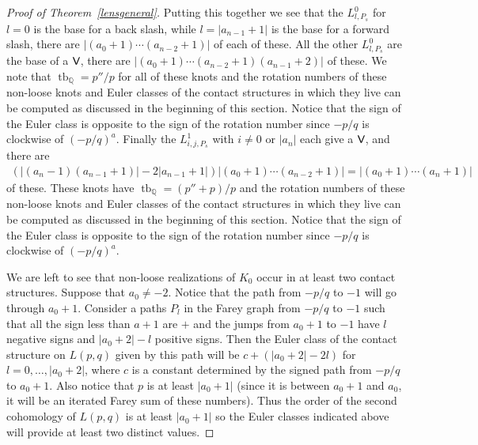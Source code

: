 \documentclass[11pt]{amsart}
\theoremstyle{plain}
\theoremstyle{definition}
\theoremstyle{remark}
\numberwithin{theorem}{section}
\newcommand{\Q}{\mathbb{Q}}           %
\DeclareMathOperator\tb{tb}                   %
\begin{document}
\begin{proof}[Proof of Theorem~\ref{lensgeneral}]
Putting this together we see that the $L^0_{l,P_s}$ for $l=0$ is the base for a back slash, while $l=|a_{n-1}+1|$ is the base for a forward slash, there are $|(a_0+1)\cdots (a_{n-2}+1)|$ of each of these. All the other $L^0_{l,P_s}$ are the base of a $\normalfont\textsf{V}$, there are $\left|(a_0+1)\cdots (a_{n-2}+1)(a_{n-1}+2)\right|$ of these. We note that 
$\tb_\Q=p''/p$ for all of these knots and the rotation numbers of these non-loose knots and Euler classes of the contact structures in which they live can be computed as discussed in the beginning of this section. Notice that the sign of the Euler class is opposite to the sign of the rotation number since $-p/q$ is clockwise of $(-p/q)^a$.  
Finally the $L^1_{i,j,P_s}$ with $i\not=0$ or $|a_n|$ each give a $\normalfont\textsf{V}$, and there are  
\begin{align*}
  (|(a_n-1)(a_{n-1}+1)|-2|a_{n-1}+1|)|(a_0+1)\cdots (a_{n-2}+1)| = |(a_0+1)\cdots(a_n+1)|
\end{align*}
of these. These knots have $\tb_\Q=(p''+p)/p$ and the rotation numbers of these non-loose knots and Euler classes of the contact structures in which they live can be computed as discussed in the beginning of this section. Notice that the sign of the Euler class is opposite to the sign of the rotation number since $-p/q$ is clockwise of $(-p/q)^a$.  

We are left to see that non-loose realizations of $K_0$ occur in at least two contact structures. Suppose that $a_0\not=-2$. Notice that the path from $-p/q$ to $-1$ will go through $a_0+1$. Consider a paths $P_l$ in the Farey graph from $-p/q$ to $-1$ such that all the sign less than $a+1$ are $+$ and the jumps from $a_0+1$ to $-1$ have $l$ negative signs and $|a_0+2|-l$ positive signs. Then the Euler class of the contact structure on $L(p,q)$ given by this path will be $c+(|a_0+2| -2l)$ for $l=0,\ldots, |a_0+2|$, where $c$ is a constant determined by the signed path from $-p/q$ to $a_0+1$. Also notice that $p$ is at least $|a_0+1|$ (since it is between $a_0+1$ and $a_0$, it will be an iterated Farey sum of these numbers).  Thus the order of the second cohomology of $L(p,q)$ is at least $|a_0+1|$ so the Euler classes indicated above will provide at least two distinct values.


\end{proof}
\end{document}
